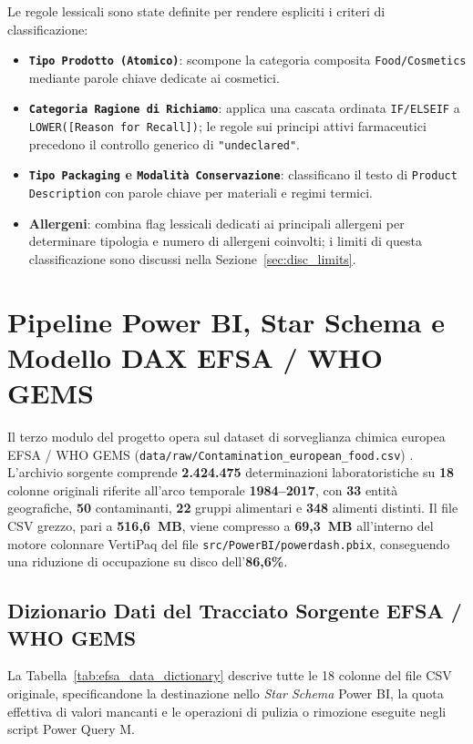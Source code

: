 Le regole lessicali sono state definite per rendere espliciti i criteri di classificazione:
\begin{itemize}
    \item \textbf{\texttt{Tipo Prodotto (Atomico)}}: scompone la categoria composita \texttt{Food/Cosmetics} mediante parole chiave dedicate ai cosmetici.
    \item \textbf{\texttt{Categoria Ragione di Richiamo}}: applica una cascata ordinata \texttt{IF/ELSEIF} a \texttt{LOWER([Reason for Recall])}; le regole sui principi attivi farmaceutici precedono il controllo generico di \texttt{"undeclared"}.
    \item \textbf{\texttt{Tipo Packaging} e \texttt{Modalità Conservazione}}: classificano il testo di \texttt{Product Description} con parole chiave per materiali e regimi termici.
    \item \textbf{Allergeni}: combina flag lessicali dedicati ai principali allergeni per determinare tipologia e numero di allergeni coinvolti; i limiti di questa classificazione sono discussi nella Sezione~\ref{sec:disc_limits}.
\end{itemize}

\section{Pipeline Power BI, Star Schema e Modello DAX EFSA / WHO GEMS}
\label{sec:method_powerbi}

Il terzo modulo del progetto opera sul dataset di sorveglianza chimica europea EFSA / WHO GEMS (\texttt{data/raw/Contamination\_european\_food.csv}) \citep{who_gems_efsa}. L'archivio sorgente comprende \textbf{2.424.475} determinazioni laboratoristiche su \textbf{18} colonne originali riferite all'arco temporale \textbf{1984--2017}, con \textbf{33} entità geografiche, \textbf{50} contaminanti, \textbf{22} gruppi alimentari e \textbf{348} alimenti distinti. Il file CSV grezzo, pari a \textbf{516,6~MB}, viene compresso a \textbf{69,3~MB} all'interno del motore colonnare VertiPaq del file \texttt{src/PowerBI/powerdash.pbix}, conseguendo una riduzione di occupazione su disco dell'\textbf{86,6\%}.

\subsection{Dizionario Dati del Tracciato Sorgente EFSA / WHO GEMS}
La Tabella~\ref{tab:efsa_data_dictionary} descrive tutte le 18 colonne del file CSV originale, specificandone la destinazione nello \textit{Star Schema} Power BI, la quota effettiva di valori mancanti e le operazioni di pulizia o rimozione eseguite negli script Power Query M.

